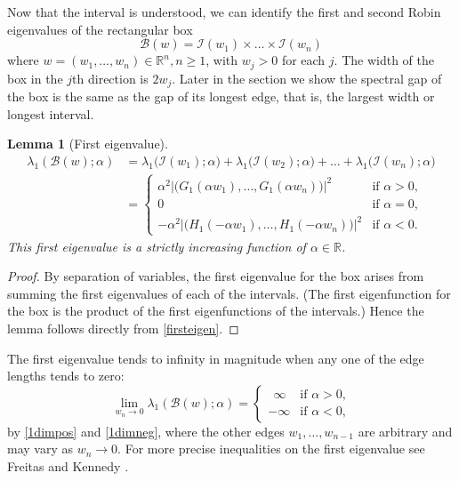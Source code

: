 \documentclass[12pt,reqno]{amsart}
\newtheorem{lemma}[lemma]{Lemma}
\theoremstyle{definition}
\newcommand{\go}{G_1}
\newcommand{\ho}{H_1}
\newcommand{\R}{{\mathbb R}}
\newcommand{\Rn}{{\mathbb R}^n}
\begin{document}
Now that the interval is understood, we can identify the first and second Robin eigenvalues of the rectangular box
\[
\mathcal{B}(w) = \mathcal{I}(w_1) \times \dots \times \mathcal{I}(w_n)
\]
where $w=(w_1,\dots,w_n) \in \Rn, n \geq 1$, with $w_j > 0$ for each $j$. The width of the box in the $j$th direction is $2w_j$. Later in the section we show the spectral gap of the box is the same as the gap of its longest edge, that is, the largest width or longest interval. 
%
\begin{lemma}[First eigenvalue] \label{firsteigenbox}
%
\begin{align*}
\lambda_1(\mathcal{B}(w);\alpha)  
& = \lambda_1\big( \mathcal{I}(w_1) ; \alpha \big) + \lambda_1\big( \mathcal{I}(w_2) ; \alpha \big) + \dots + \lambda_1\big( \mathcal{I}(w_n) ; \alpha \big) \\
& = 
\begin{cases}
\alpha^2 \left| \big( \go(\alpha {w_1}), \dots , \go(\alpha {w_n}) \big) \right|^2 & \text{if $\alpha>0$,} \\
0 & \text{if $\alpha=0$,} \\
- \alpha^2 \left| \big( \ho(-\alpha {w_1}), \dots , \ho(-\alpha {w_n}) \big) \right|^2 & \text{if $\alpha<0$.}
\end{cases}
\end{align*}
%
This first eigenvalue is a strictly increasing function of $\alpha \in \R$. 
\end{lemma}
%
\begin{proof}
By separation of variables, the first eigenvalue for the box arises from summing the first eigenvalues of each of the intervals. (The first eigenfunction for the box is the product of the first eigenfunctions of the intervals.) Hence the lemma follows directly from \autoref{firsteigen}. 
\end{proof}
%
The first eigenvalue tends to infinity in magnitude when any one of the edge lengths tends to zero:
%
\begin{equation}\label{firsttoinfinity}
\lim_{w_n \to 0} \lambda_1(\mathcal{B}(w);\alpha) = 
\begin{cases}
\ \ \infty & \text{if $\alpha>0$,} \\
-\infty & \text{if $\alpha<0$,}
\end{cases}
\end{equation}
%
by \autoref{1dimpos} and \autoref{1dimneg}, where the other edges $w_1,\dots,w_{n-1}$ are arbitrary and may vary as $w_n \to 0$. For more precise inequalities on the first eigenvalue see Freitas and Kennedy \cite[Appendix A.1]{FK18}. 
\end{document}
